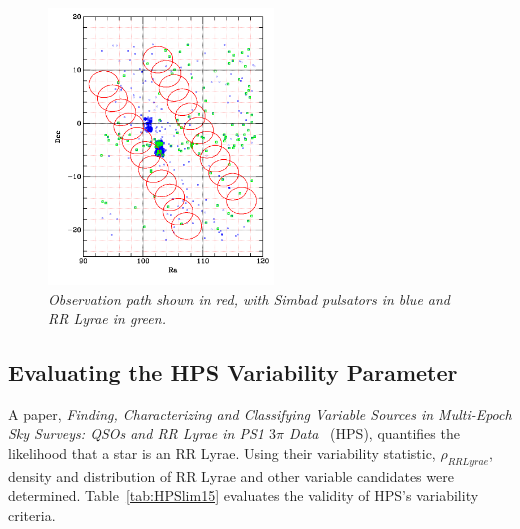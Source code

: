 \documentclass[aps,prb,twocolumn,superscriptaddress]{revtex4-1}
\begin{document}
\begin{figure}[H]
 \centering
 	\includegraphics[width=2.35in]{figures/simbadoverlap.png}%
 \caption{\it \small{Observation path shown in red, with Simbad pulsators in blue and RR Lyrae in green.}}
 \label{fig:simoverlap}
\end{figure}




\subsection{Evaluating the HPS Variability Parameter}\label{sec:HPS}

A paper, \textit{Finding, Characterizing and Classifying Variable Sources in Multi-Epoch Sky Surveys: QSOs and RR Lyrae in PS1 $3\pi$ Data}~\cite{PSdata} (HPS), quantifies the likelihood that a star is an RR Lyrae.  Using their variability statistic, $\rho_{RRLyrae}$, density and distribution of RR Lyrae and other variable candidates were determined.  Table~\ref{tab:HPSlim15} evaluates the validity of HPS's variability criteria.
\end{document}
